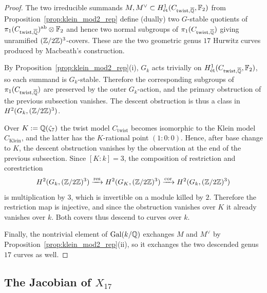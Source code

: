 \documentclass[main.tex]{subfiles}
\begin{document}
\begin{proof}
The two irreducible summands $M, M^{\vee} \subset H^1_{\mathrm{\acute{e}t}}(C_{\mathrm{twist},\overline{\mathbb{Q}}}, \mathbb{F}_2)$ from Proposition~\ref{prop:klein_mod2_rep} define (dually) two $G$-stable quotients of $\pi_1(C_{\mathrm{twist},\overline{\mathbb{Q}}})^{\mathrm{ab}} \otimes \mathbb{F}_2$ and hence two normal subgroups of $\pi_1(C_{\mathrm{twist},\overline{\mathbb{Q}}})$ giving unramified $(\mathbb{Z}/2\mathbb{Z})^3$-covers. These are the two geometric genus $17$ Hurwitz curves produced by Macbeath's construction.
\par
By Proposition~\ref{prop:klein_mod2_rep}(i), $G_k$ acts trivially on $H^1_{\mathrm{\acute{e}t}}(C_{\mathrm{twist},\overline{\mathbb{Q}}}, \mathbb{F}_2)$, so each summand is $G_k$-stable. Therefore the corresponding subgroups of $\pi_1(C_{\mathrm{twist},\overline{\mathbb{Q}}})$ are preserved by the outer $G_k$-action, and the primary obstruction of the previous subsection vanishes. The descent obstruction is thus a class in $H^2(G_k, (\mathbb{Z}/2\mathbb{Z})^3)$.
\par
Over $K := \mathbb{Q}(\zeta_7)$ the twist model $C_{\mathrm{twist}}$ becomes isomorphic to the Klein model $C_{\mathrm{Klein}}$, and the latter has the $K$-rational point $(1:0:0)$. Hence, after base change to $K$, the descent obstruction vanishes by the observation at the end of the previous subsection. Since $[K:k] = 3$, the composition of restriction and corestriction
\[
H^2(G_k, (\mathbb{Z}/2\mathbb{Z})^3) \xrightarrow{\mathrm{res}} H^2(G_K, (\mathbb{Z}/2\mathbb{Z})^3) \xrightarrow{\mathrm{cor}} H^2(G_k, (\mathbb{Z}/2\mathbb{Z})^3)
\]
is multiplication by $3$, which is invertible on a module killed by $2$. Therefore the restriction map is injective, and since the obstruction vanishes over $K$ it already vanishes over $k$. Both covers thus descend to curves over $k$.
\par
Finally, the nontrivial element of $\operatorname{\mathrm{Gal}}(k/\mathbb{Q})$ exchanges $M$ and $M^{\vee}$ by Proposition~\ref{prop:klein_mod2_rep}(ii), so it exchanges the two descended genus $17$ curves as well.
\end{proof}

\subsection{The Jacobian of $X_{17}$}
\end{document}
